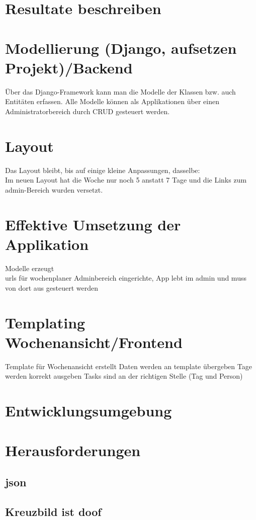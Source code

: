 \section{Resultate beschreiben}
\section{Modellierung (Django, aufsetzen Projekt)/Backend }
Über das Django-Framework kann man die Modelle der Klassen bzw. auch Entitäten erfassen.
Alle Modelle können als Applikationen über einen Administratorbereich durch CRUD gesteuert werden.
\section{Layout}
Das Layout bleibt, bis auf einige kleine Anpassungen, dasselbe:\\
Im neuen Layout hat die Woche nur noch 5 anstatt 7 Tage und die Links zum admin-Bereich wurden versetzt.
\section{Effektive Umsetzung der Applikation}
Modelle erzeugt\\
urls für wochenplaner
Adminbereich eingerichte, App lebt im admin und muss von dort aus gesteuert werden\\
\section{Templating Wochenansicht/Frontend}
Template für Wochenansicht erstellt
Daten werden an template übergeben
Tage werden korrekt ausgeben
Tasks sind an der richtigen Stelle (Tag und Person)
\section{Entwicklungsumgebung}
\section{Herausforderungen}
\subsection{json}
\subsection{Kreuzbild ist doof}

